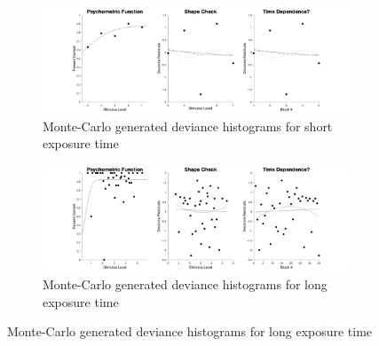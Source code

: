 \documentclass{article}
\begin{document}
\begin{figure}[!hb]
    \begin{subfigure}{\linewidth}
        \centering
        \includegraphics[width=1.3\linewidth]{Thesis/plots/gof/cutNo/cutNo_js_short_deviance.png}
        \caption{Monte-Carlo generated deviance histograms for short exposure time}
    \end{subfigure}
    \begin{subfigure}{\linewidth}
        \centering
        \includegraphics[width=1.3\linewidth]{Thesis/plots/gof/segDist/segDist_js_long_deviance.png}
        \caption{Monte-Carlo generated deviance histograms for long exposure time}
    \end{subfigure}
    
\end{figure}

\clearpage
\end{document}
